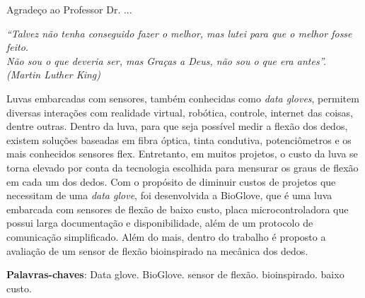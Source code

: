 \documentclass[
	12pt,				%
	openright,			%
	oneside,			%
	a4paper,			%
	english,			%
	brazil				%
	]{abntex2}
\begin{document}
\begin{agradecimentos}
Agradeço ao Professor Dr. ...
\end{agradecimentos}

\begin{epigrafe}
    \vspace*{\fill}
	\begin{flushright}
		\textit{``Talvez não tenha conseguido fazer o melhor, mas lutei para que o melhor fosse feito. \\ Não sou o que deveria ser, mas Graças a Deus, não sou o que era antes''. \\ (Martin Luther King)}
	\end{flushright}
\end{epigrafe}


\setlength{\absparsep}{18pt} %
\begin{resumo}
	\hspace{1.5cm}Luvas embarcadas com sensores, também conhecidas como \textit{data gloves}, permitem diversas interações com realidade virtual, robótica, controle, internet das coisas, dentre outras. Dentro da luva, para que seja possível medir a flexão dos dedos, existem soluções baseadas em fibra óptica, tinta condutiva, potenciômetros e os mais conhecidos sensores flex. Entretanto, em muitos projetos, o custo da luva se torna elevado por conta da tecnologia escolhida para mensurar os graus de flexão em cada um dos dedos. Com o propósito de diminuir custos de projetos que necessitam de uma \textit{data glove}, foi desenvolvida a BioGlove, que é uma luva embarcada com sensores de flexão de baixo custo, placa microcontroladora que possui larga documentação e disponibilidade, além de um protocolo de comunicação simplificado. Além do mais, dentro do trabalho é proposto a avaliação de um sensor de flexão bioinspirado na mecânica dos dedos.


 \textbf{Palavras-chaves}: Data glove. BioGlove. sensor de flexão. bioinspirado. baixo custo.
\end{resumo}
\end{document}

